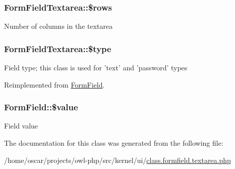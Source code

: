 \subsubsection[{\$rows}]{\setlength{\rightskip}{0pt plus 5cm}FormFieldTextarea::\$rows}\label{classFormFieldTextarea_ab3a8058daa4c23d597e4003366075b59}
Number of columns in the textarea 
\subsubsection[{\$type}]{\setlength{\rightskip}{0pt plus 5cm}FormFieldTextarea::\$type}\label{classFormFieldTextarea_a85348034822c70694fc8640bfcacc04d}
Field type; this class is used for 'text' and 'password' types 

Reimplemented from \hyperlink{classFormField_a37bed21a1891e95be0e4a697e45ba51b}{FormField}.

\subsubsection[{\$value}]{\setlength{\rightskip}{0pt plus 5cm}FormField::\$value}\label{classFormField_a3c01e89834248eec8e2f145fbcfa0fbc}
Field value 

The documentation for this class was generated from the following file:\begin{DoxyCompactItemize}
\item 
/home/oscar/projects/owl-\/php/src/kernel/ui/\hyperlink{class_8formfield_8textarea_8php}{class.formfield.textarea.php}\end{DoxyCompactItemize}
